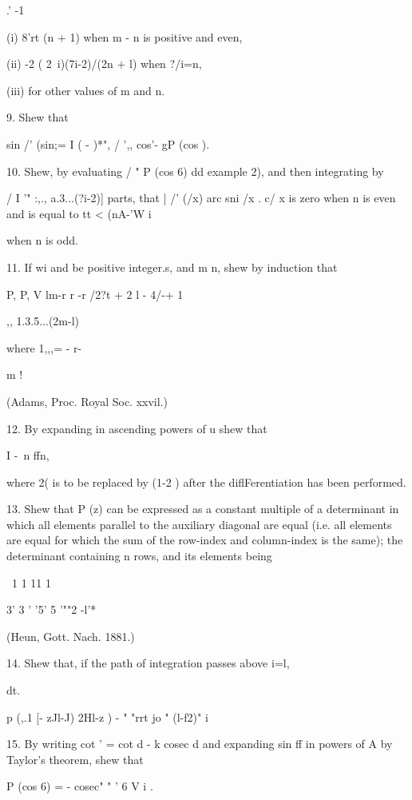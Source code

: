 {{{{.' -1

(i) 8'rt (n + 1) when m - n is positive and even,

(ii) -2 ( 2\ i)(7i-2)/(2n + l) when ?/i=n,

(iii) for other values of m and n. 

9. Shew that

sin /' (sin;= I ( - )*", / ',, cos'- gP (cos ).


10. Shew, by evaluating / " P (cos 6) dd  example 2), and then
integrating by

/ I '" :,., a.3...(?i-2)] parts, that | /' (/x) arc sni /x . c/ x is
zero when n is even and is equal to tt < (nA-'W i

when n is odd. 

11. If wi and be positive integer.s, and m n, shew by induction that

P, P, V lm-r r -r /2?t + 2 l - 4/-+ 1 \

,, 1.3.5...(2m-l)

where 1,,,= - r- 

m !

(Adams, Proc. Royal Soc. xxvil.)

12. By expanding in ascending powers of u shew that

I -\ n ffn,

where 2( is to be replaced by (1-2 ) after the diflFerentiation has
been performed.

13. Shew that P (z) can be expressed as a constant multiple of a
determinant in which all elements parallel to the auxiliary diagonal
are equal (i.e. all elements are equal for which the sum of the
row-index and column-index is the same); the determinant containing n
rows, and its elements being

\ 1 1 11 1

3' 3 ' '5' 5 '""2 -l'*

(Heun, Gott. Nach. 1881.)

14. Shew that, if the path of integration passes above i=l,

dt. 

p (,.1 [- zJl-J) 2Hl-z ) - " "rrt jo " (l-f2)" i

15. By writing cot ' = cot d - k cosec d and expanding sin ff in
powers of A by Taylor's theorem, shew that

P (cos 6) = - cosec" " ' 6 V i . 

}}}}

